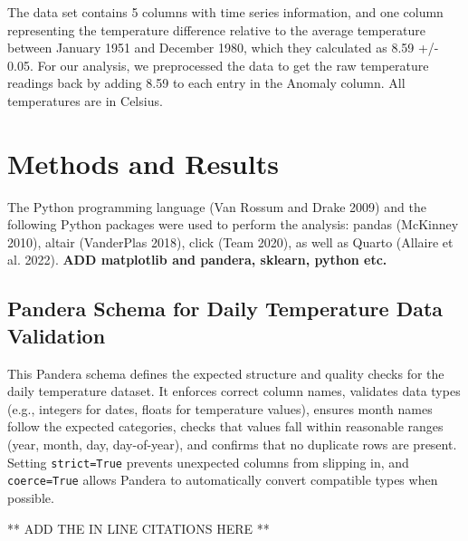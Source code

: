 \documentclass[
  letterpaper,
  DIV=11,
  numbers=noendperiod]{scrartcl}
\begin{document}
The data set contains 5 columns with time series information, and one
column representing the temperature difference relative to the average
temperature between January 1951 and December 1980, which they
calculated as 8.59 +/- 0.05. For our analysis, we preprocessed the data
to get the raw temperature readings back by adding 8.59 to each entry in
the Anomaly column. All temperatures are in Celsius.

\section{Methods and Results}\label{methods-and-results}

The Python programming language (Van Rossum and Drake 2009) and the
following Python packages were used to perform the analysis: pandas
(McKinney 2010), altair (VanderPlas 2018), click (Team 2020), as well as
Quarto (Allaire et al. 2022). \textbf{ADD matplotlib and pandera,
sklearn, python etc.}

\subsection{Pandera Schema for Daily Temperature Data
Validation}\label{pandera-schema-for-daily-temperature-data-validation}

This Pandera schema defines the expected structure and quality checks
for the daily temperature dataset. It enforces correct column names,
validates data types (e.g., integers for dates, floats for temperature
values), ensures month names follow the expected categories, checks that
values fall within reasonable ranges (year, month, day, day-of-year),
and confirms that no duplicate rows are present. Setting
\texttt{strict=True} prevents unexpected columns from slipping in, and
\texttt{coerce=True} allows Pandera to automatically convert compatible
types when possible.

** ADD THE IN LINE CITATIONS HERE **
\end{document}
